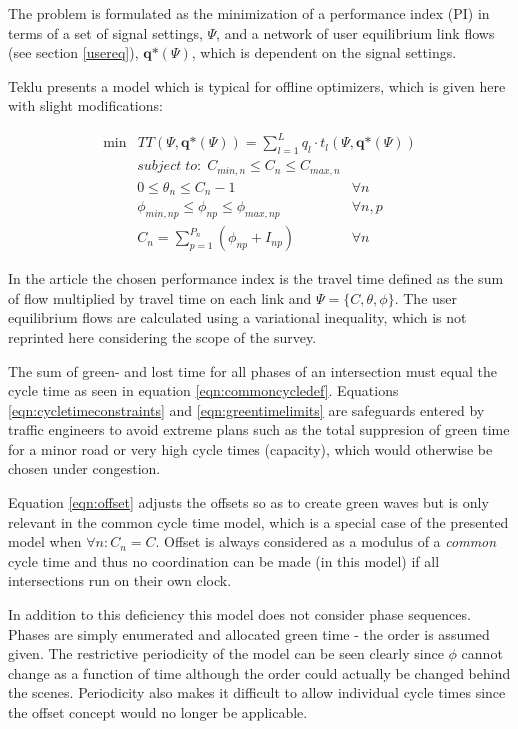 The problem is formulated as the minimization of a performance index (PI) in terms of a set of signal settings, $\Psi$, and a network of user equilibrium link flows (see section \ref{usereq}), $\textbf{q*}(\Psi)$, which is dependent on the signal settings.

Teklu \cite{2} presents a model which is typical for offline optimizers, which is given here with slight modifications:

\begin{eqnarray}
\min & TT(\Psi, \textbf{q*}\left( \Psi\right)) = \displaystyle\sum_{l = 1}^{L} q_l \cdot t_l(\Psi,\textbf{q*}(\Psi))
\end{eqnarray}
\begin{eqnarray}
\label{eqn:cycletimeconstraints} subject\;to:\;C_{min,n} \leq C_n \leq C_{max,n} & \\
\label{eqn:offset} 0 \leq \theta_n \leq C_n-1 & \forall n \\
\label{eqn:greentimelimits} \phi_{min,np} \leq \phi_{np} \leq \phi_{max,np} & \forall n,p \\
\label{eqn:commoncycledef} C_n = \sum_{p=1}^{P_n} ( \phi_{np} + I_{np} ) & \forall n
\end{eqnarray}

In the article the chosen performance index is the travel time defined as the sum of flow multiplied by travel time on each link and $\Psi = \lbrace C,\theta,\phi \rbrace$. The user equilibrium flows are calculated using a variational inequality, which is not reprinted here considering the scope of the survey.

The sum of green- and lost time for all phases of an intersection must equal the cycle time as seen in equation \ref{eqn:commoncycledef}. Equations \ref{eqn:cycletimeconstraints} and \ref{eqn:greentimelimits} are safeguards entered by traffic engineers to avoid extreme plans such as the total suppresion of green time for a minor road or very high cycle times (capacity), which would otherwise be chosen under congestion.

Equation \ref{eqn:offset} adjusts the offsets so as to create green waves but is only relevant in the common cycle time model, which is a special case of the presented model when $\forall n : C_n = C$. Offset is always considered as a modulus of a \textit{common} cycle time and thus no coordination can be made (in this model) if all intersections run on their own clock.

In addition to this deficiency this model does not consider phase sequences. Phases are simply enumerated and allocated green time - the order is assumed given. The restrictive periodicity of the model can be seen clearly since $\phi$ cannot change as a function of time although the order could actually be changed behind the scenes. Periodicity also makes it difficult to allow individual cycle times since the offset concept would no longer be applicable.

